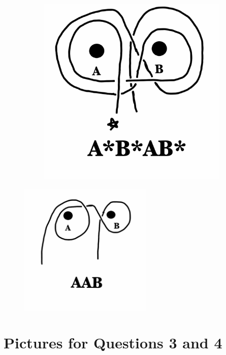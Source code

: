 \documentclass[12pt,letterpaper]{article}
\theoremstyle{definition}
\begin{document}
\begin{figure}[h!]
\begin{subfigure}[b]{0.4\textwidth}
        \includegraphics[width=\textwidth]{phppics/AsBsABs-label.png}
    \end{subfigure}
\end{figure}

\begin{figure}[h]
    \includegraphics[height=2.5in]{phppics/AABs-badlabel.png}
\end{figure}

\clearpage


\section*{Pictures for Questions 3 and 4}
\end{document}
